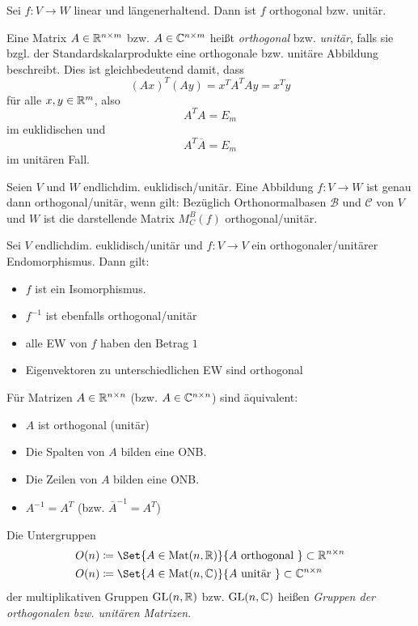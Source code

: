 \documentclass{cheat-sheet}
\newcommand{\GL}{\mathrm{GL}}
\newcommand{\Mat}{\mathrm{Mat}}
\newcommand{\BB}{\mathcal{B}}
\newcommand{\BC}{\mathcal{C}}
\begin{document}
\begin{satz}
  Sei $f : V \to W$ linear und längenerhaltend. Dann ist $f$ orthogonal bzw. unitär.
\end{satz}

\begin{defn}
  Eine Matrix $A \in \mathbb{R}^{n \times m}$ bzw. $A \in \mathbb{C}^{n \times m}$ heißt \emph{orthogonal} bzw. \emph{unitär}, falls sie bzgl. der Standardskalarprodukte eine orthogonale bzw. unitäre Abbildung beschreibt. Dies ist gleichbedeutend damit, dass
  \[ (Ax)^T (Ay) = x^T A^T Ay = x^T y \]
  für alle $x, y \in \mathbb{R}^m$, also
  \[ A^T A = E_m \]
  im euklidischen und
  \[ A^T \overline{A} = E_m \]
  im unitären Fall.
\end{defn}

\begin{satz}
  Seien $V$ und $W$ endlichdim. euklidisch/unitär. Eine Abbildung $f : V \to W$ ist genau dann orthogonal/unitär, wenn gilt: Bezüglich Orthonormalbasen $\BB$ und $\BC$ von $V$ und $W$ ist die darstellende Matrix $M_C^B(f)$ orthogonal/unitär.
\end{satz}

\begin{satz}
  Sei $V$ endlichdim. euklidisch/unitär und $f : V \to V$ ein orthogonaler/unitärer Endomorphismus. Dann gilt:
  \begin{itemize}
    \item $f$ ist ein Isomorphismus.
    \item $f^{-1}$ ist ebenfalls orthogonal/unitär
    \item alle EW von $f$ haben den Betrag $1$
    \item Eigenvektoren zu unterschiedlichen EW sind orthogonal
  \end{itemize}
\end{satz}

\begin{bem}
  Für Matrizen $A \in \mathbb{R}^{n \times n}$ (bzw. $A \in \mathbb{C}^{n \times n}$) sind äquivalent:
  \begin{itemize}
    \item $A$ ist orthogonal (unitär)
    \item Die Spalten von $A$ bilden eine ONB.
    \item Die Zeilen von $A$ bilden eine ONB.
    \item $A^{-1} = A^T$ (bzw. $\overline{A}^{-1} = A^T$)
  \end{itemize}
\end{bem}

\begin{defn}
  Die Untergruppen
  \begin{align*}
  O(n) &\coloneqq \Set{ A \in \Mat(n, \R) }{ A \text{ orthogonal } } \subset \R^{n \times n} \\
  O(n) &\coloneqq \Set{ A \in \Mat(n, \C) }{ A \text{ unitär } } \subset \C^{n \times n} \\
  \end{align*}
  der multiplikativen Gruppen $\GL(n, \R)$ bzw. $\GL(n, \C)$ heißen \emph{Gruppen der orthogonalen bzw. unitären Matrizen}.
\end{defn}
\end{document}
